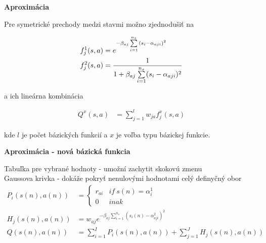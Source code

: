 \documentclass[xcolor=dvipsnames]{beamer}
\begin{document}
\begin{frame}{\bf Aproximácia}

Pre symetrické prechody medzi stavmi možno zjednodušiť na

\begin{align*}
f_j^1(\boldmath{s, a}) &= e^{ -\beta_{aj} \sum\limits_{i=1}^{n_s}{(s_i - \alpha_{aji})^2} }  \\
f_j^2(\boldmath{s, a}) &= \frac{1}{1 + {\beta_{aj} \sum\limits_{i=1}^{n_s}(s_i - \alpha_{aji})^2}}  \\
\end{align*}

a ich lineárna kombinácia

\begin{align}
    Q^x(s, a)&= \sum\limits_{j=1}^{l}w_{j a}f^x_{j}(s, a) \nonumber
\end{align}

kde $l$ je počet bázických funkcií a $x$ je voľba typu bázickej funkcie.



\end{frame}


\begin{frame}{\bf Aproximácia - nová bázická funkcia}

Tabuľka pre vybrané hodnoty - umožní zachytit skokovú zmenu \\
Gaussova krivka - dokáže pokryť nenulovými hodnotami celý definyčný obor \\

\begin{align}
P_i(s(n), a(n)) &=
\left\{
	\begin{array}{ll}
		r_{ai}  & if \ s(n) = \alpha^1_i \\
		0 & inak
	\end{array}
\right. \\
  H_j(s(n), a(n)) &= w_{aj} e^{ -\beta_{aj} \sum\limits_{i=1}^{n_s}{(s_i(n) - \alpha^2_{aji})^2 }} \\
  Q(s(n), a(n)) &= \sum\limits_{i=1}^{I} P_i(s(n),a(n)) + \sum\limits_{j=1}^{J} H_j(s(n), a(n))
  \label{eq:peak_hill}
\end{align}


\end{frame}
\end{document}
